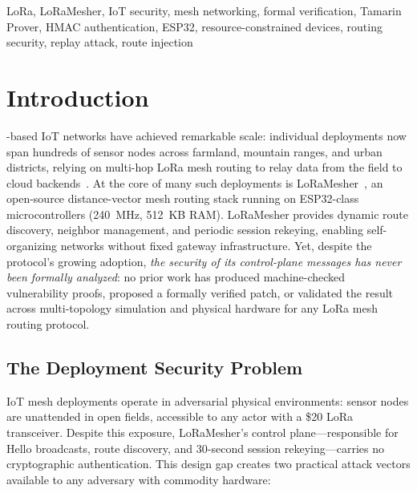 \documentclass[10pt,journal,compsoc]{IEEEtran}
\begin{document}
{\begin{IEEEkeywords}
LoRa, LoRaMesher, IoT security, mesh networking, formal verification,
Tamarin Prover, HMAC authentication, ESP32, resource-constrained devices,
routing security, replay attack, route injection
\end{IEEEkeywords}

}%

\maketitle
\IEEEdisplaynontitleabstractindextext
\IEEEpeerreviewmaketitle

\section{Introduction}
\label{sec:intro}

-based IoT networks have achieved remarkable
scale: individual deployments now span hundreds of sensor nodes
across farmland, mountain ranges, and urban districts, relying on
multi-hop LoRa mesh routing to relay data from the field to cloud
backends~\cite{repetto2025-lorawan-drone-attack,yang2021-lorawan-systematic,ieee2025-lora-hierarchy-routing}. At the core of
many such deployments is LoRaMesher~\cite{sole2022-loramesher,sole2024-loramesher-dv},
an open-source distance-vector mesh routing stack running on
ESP32-class microcontrollers (240~MHz, 512~KB RAM).
LoRaMesher provides dynamic route discovery, neighbor management,
and periodic session rekeying, enabling self-organizing networks
without fixed gateway infrastructure.
Yet, despite the protocol's growing adoption, \emph{the security
of its control-plane messages has never been formally analyzed}:
no prior work has produced machine-checked vulnerability proofs,
proposed a formally verified patch, or validated the result across
multi-topology simulation and physical hardware for any LoRa mesh
routing protocol.

\subsection{The Deployment Security Problem}

IoT mesh deployments operate in adversarial physical environments:
sensor nodes are unattended in open fields, accessible to any
actor with a \$20 LoRa transceiver. Despite this exposure,
LoRaMesher's control plane—responsible for Hello broadcasts,
route discovery, and 30-second session rekeying—carries no
cryptographic authentication. This design gap creates two practical
attack vectors available to any adversary with commodity hardware:
\end{document}
